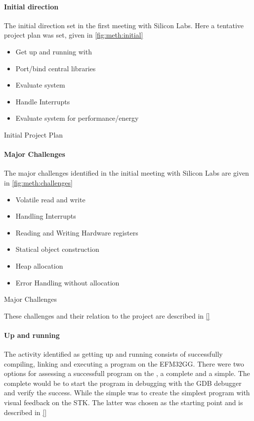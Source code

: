 \paragraph{Initial direction}
The initial direction set in the first meeting with Silicon Labs.
Here a tentative project plan was set, given in \autoref{fig:meth:initial}

\begin{listing}[H]
  \begin{itemize}
    \item Get up and running with {\rust}
    \item Port/bind central libraries
    \item Evaluate system
    \item Handle Interrupts
    \item Evaluate system for performance/energy
  \end{itemize}
  \caption{Initial Project Plan}
  \label{fig:meth:initial}
\end{listing}

\paragraph{Major Challenges}

The major challenges identified in the initial meeting with Silicon Labs are given in \autoref{fig:meth:challenges}

\begin{listing}[H]
  \begin{itemize}
    \item Volatile read and write
    \item Handling Interrupts
    \item Reading and Writing Hardware registers
    \item Statical object construction
    \item Heap allocation
    \item Error Handling without allocation
  \end{itemize}
  \caption{Major Challenges}
  \label{fig:meth:challenges}
\end{listing}

These challenges and their relation to the project are described in \autoref{} 

\paragraph{Up and running}
The activity identified as getting up and running consists of successfully compiling, linking and executing a {\rust} program on the EFM32GG.
There were two options for assessing a successfull program on the {\gecko}, a complete and a simple.
The complete would be to start the program in debugging with the GDB debugger and verify the success.
While the simple was to create the simplest program with visual feedback on the STK.
The latter was chosen as the starting point and is described in \autoref{} 


